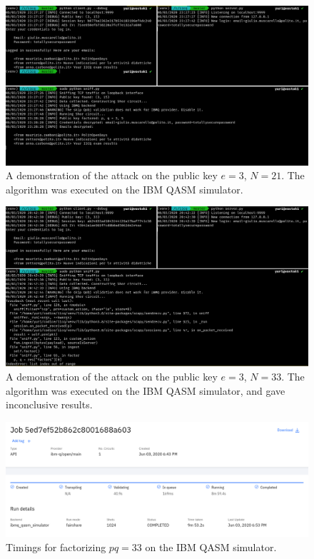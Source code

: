 \documentclass[conference]{IEEEtran}
\begin{document}
\begin{figure}[t]
   \centering
   \includegraphics[width=\textwidth,height=\textheight,keepaspectratio]{2020-06-03_23-29.png}
   \caption{A demonstration of the attack on the public key $e=3$, $N=21$. The algorithm was executed on the IBM QASM simulator.}
\end{figure}

\begin{figure}[t]
   \centering
   \includegraphics[width=\textwidth,height=\textheight,keepaspectratio]{2020-06-03_20-54.png}
   \caption{A demonstration of the attack on the public key $e=3$, $N=33$. The algorithm was executed on the IBM QASM simulator, and gave inconclusive results.}
\end{figure}

\begin{figure}[t]
   \centering
   \includegraphics[width=\textwidth,height=\textheight,keepaspectratio]{2020-06-03_20-56.png}
   \caption{Timings for factorizing $pq=33$ on the IBM QASM simulator.}
\end{figure}
\end{document}
